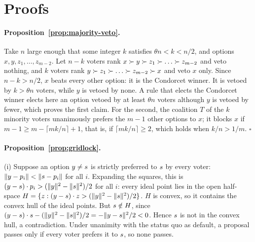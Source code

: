 \section{Proofs}\label{app:proofs}

\paragraph{Proposition~\ref{prop:majority-veto}.}
Take $n$ large enough that some integer $k$ satisfies $\theta n < k < n/2$, and options
$x, y, z_1, \dots, z_{m-2}$. Let $n-k$ voters rank $x \pref y \pref z_1 \pref \dots \pref z_{m-2}$ and
veto nothing, and $k$ voters rank $y \pref z_1 \pref \dots \pref z_{m-2} \pref x$ and veto $x$ only. Since
$n - k > n/2$, $x$ beats every other option: it is the Condorcet winner. It is vetoed by
$k > \theta n$ voters, while $y$ is vetoed by none. A rule that elects the Condorcet winner elects here an
option vetoed by at least $\theta n$ voters although $y$ is vetoed by fewer, which proves the first
claim. For the second, the coalition $T$ of the $k$ minority voters unanimously prefers the $m-1$ other
options to $x$; it blocks $x$ if $m - 1 \ge m - \lceil mk/n \rceil + 1$, that is, if
$\lceil mk/n \rceil \ge 2$, which holds when $k/n > 1/m$. \hfill$\square$

\paragraph{Proposition~\ref{prop:gridlock}.}
(i) Suppose an option $y \neq s$ is strictly preferred to $s$ by every voter:
$\|y - p_i\| < \|s - p_i\|$ for all $i$. Expanding the squares, this is
$(y - s) \cdot p_i > (\|y\|^2 - \|s\|^2)/2$ for all $i$: every ideal point lies in the open half-space
$H = \{z : (y - s) \cdot z > (\|y\|^2 - \|s\|^2)/2\}$. $H$ is convex, so it contains the convex hull of
the ideal points. But $s \notin H$, since $(y - s) \cdot s - (\|y\|^2 - \|s\|^2)/2 = -\|y-s\|^2/2 < 0$.
Hence $s$ is not in the convex hull, a contradiction. Under unanimity with the status quo as default,
a proposal passes only if every voter prefers it to $s$, so none passes.

